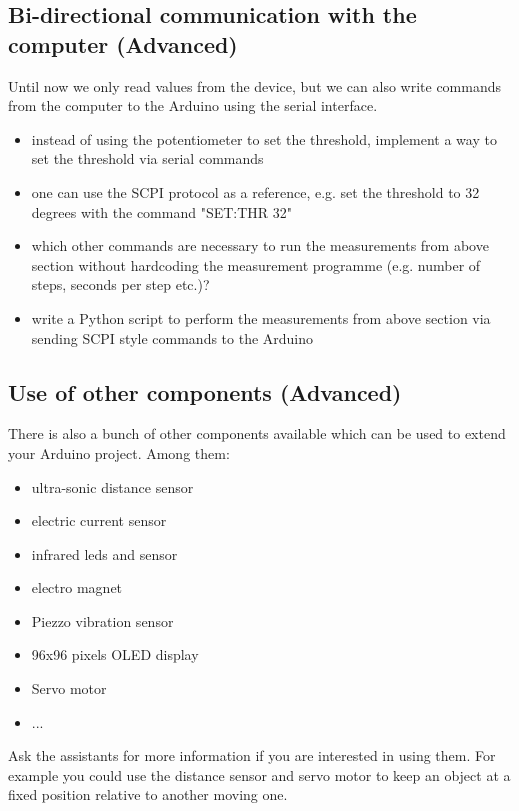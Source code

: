 \subsection{Bi-directional communication with the computer (Advanced)}
Until now we only read values from the device, but we can also write commands from the computer to the Arduino using the serial interface.
\begin{itemize}
	\item instead of using the potentiometer to set the threshold, implement a way to set the threshold via serial commands
	\item one can use the SCPI protocol as a reference, e.g. set the threshold to 32 degrees with the command "SET:THR 32"
	\item which other commands are necessary to run the measurements from above section without hardcoding the measurement programme (e.g. number of steps, seconds per step etc.)?
	\item write a Python script to perform the measurements from above section via sending SCPI style commands to the Arduino
\end{itemize}


\subsection{Use of other components (Advanced)}
There is also a bunch of other components available which can be used to extend your Arduino project. Among them:
\begin{itemize}
	\item ultra-sonic distance sensor
	\item electric current sensor
	\item infrared leds and sensor
	\item electro magnet
	\item Piezzo vibration sensor
	\item 96x96 pixels OLED display
	\item Servo motor
	\item ...
\end{itemize}

Ask the assistants for more information if you are interested in using them. For example you could use the distance sensor and servo motor to keep an object at a fixed position relative to another moving one.


